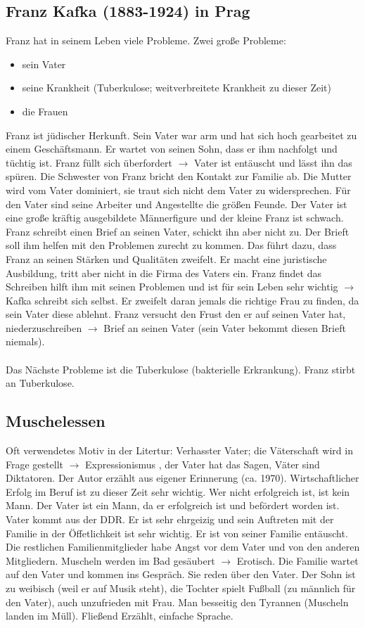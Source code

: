 \documentclass[12pt,a4paper]{article}
\begin{document}
\subsection{Franz Kafka (1883-1924) in Prag}

Franz hat in seinem Leben viele Probleme. Zwei große Probleme:

\begin{itemize}
\item sein Vater
\item seine Krankheit (Tuberkulose; weitverbreitete Krankheit zu dieser Zeit)
\item die Frauen
\end{itemize}
Franz ist jüdischer Herkunft. Sein Vater war arm und hat sich hoch gearbeitet zu einem Geschäftsmann. Er wartet von seinen Sohn, dass er ihm nachfolgt und tüchtig ist. Franz füllt sich überfordert $\rightarrow$ Vater ist entäuscht und lässt ihn das spüren. Die Schwester von Franz bricht den Kontakt zur Familie ab. Die Mutter wird vom Vater dominiert, sie traut sich nicht dem Vater zu widersprechen. Für den Vater sind seine Arbeiter und Angestellte die größen Feunde. Der Vater ist eine große kräftig ausgebildete Männerfigure und der kleine Franz ist schwach. Franz schreibt einen Brief an seinen Vater, schickt ihn aber nicht zu. Der Brieft soll ihm helfen mit den Problemen zurecht zu kommen. Das führt dazu, dass Franz an seinen Stärken und Qualitäten zweifelt. Er macht eine juristische Ausbildung, tritt aber nicht in die Firma des Vaters ein. Franz findet das Schreiben hilft ihm mit seinen Problemen und ist für sein Leben sehr wichtig $\rightarrow$ Kafka schreibt sich selbst. Er zweifelt daran jemals die richtige Frau zu finden, da sein Vater diese ablehnt. Franz versucht den Frust den er auf seinen Vater hat, niederzuschreiben $\rightarrow$ Brief an seinen Vater (sein Vater bekommt diesen Brieft niemals).\\\\
Das Nächste Probleme ist die Tuberkulose (bakterielle Erkrankung). Franz stirbt an Tuberkulose.

\subsection{Muschelessen}

Oft verwendetes Motiv in der Litertur: Verhasster Vater; die Väterschaft wird in Frage gestellt $\rightarrow$ Expressionismus , der Vater hat das Sagen, Väter sind Diktatoren. Der Autor erzählt aus eigener Erinnerung (ca. 1970). Wirtschaftlicher Erfolg im Beruf ist zu dieser Zeit sehr wichtig. Wer nicht erfolgreich ist, ist kein Mann. Der Vater ist ein Mann, da er erfolgreich ist und befördert worden ist. Vater kommt aus der DDR. Er ist sehr ehrgeizig und sein Auftreten mit der Familie in der Öffetlichkeit ist sehr wichtig. Er ist von seiner Familie entäuscht. Die restlichen Familienmitglieder habe Angst vor dem Vater und von den anderen Mitgliedern. Muscheln werden im Bad gesäubert $\rightarrow$ Erotisch. Die Familie wartet auf den Vater und kommen ins Gespräch. Sie reden über den Vater. Der Sohn ist zu weibisch (weil er auf Musik steht), die Tochter spielt Fußball (zu männlich für den Vater), auch unzufrieden mit Frau. Man besseitig den Tyrannen (Muscheln landen im Müll). Fließend Erzählt, einfache Sprache.
\end{document}
